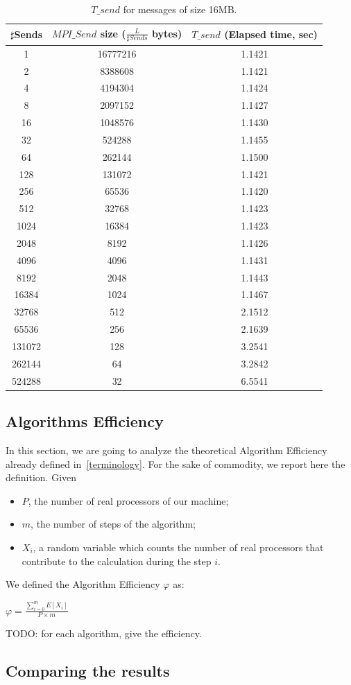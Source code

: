 \begin{table}[h]
\begin{center}
\begin{tabular}{|c|c|c|}\hline
\hline
$\sharp$Sends          & $MPI\_Send$ size ($\frac{L}{\sharp Sends}$ bytes)          & $T\_send$ (Elapsed time, sec)      \\\hline\hline
1 & 16777216 & 1.1421 \\\hline
2 & 8388608 & 1.1421 \\\hline
4 & 4194304 & 1.1424 \\\hline
8 & 2097152 & 1.1427 \\\hline
16 & 1048576 & 1.1430 \\\hline
32 & 524288 & 1.1455 \\\hline
64 & 262144 & 1.1500 \\\hline
128 & 131072 & 1.1421 \\\hline
256 & 65536 & 1.1420 \\\hline
512 & 32768 & 1.1423 \\\hline
1024 & 16384 & 1.1423 \\\hline
2048 & 8192 & 1.1426 \\\hline
4096 & 4096 & 1.1431 \\\hline
8192 & 2048 & 1.1443 \\\hline
16384 & 1024 & 1.1467 \\\hline
32768 & 512 & 2.1512 \\\hline
65536 & 256 & 2.1639 \\\hline
131072 & 128 & 3.2541 \\\hline
262144 & 64 & 3.2842 \\\hline
524288 & 32 & 6.5541 \\\hline
\hline
\end{tabular}
\caption{$T\_send$ for messages of size 16MB. }
\label{tsetup-impact-16}
\end{center}
\end{table}



\subsection{Algorithms Efficiency}
In this section, we are going to analyze the theoretical Algorithm Efficiency already defined in~\ref{terminology}. For the sake of commodity, we report here the definition. Given
\begin{itemize}
\item $P$, the number of real processors of our machine; 
\item $m$, the number of steps of the algorithm;
\item $X_i$, a random variable which counts the number of real processors that contribute to the calculation during the step $i$.
\end{itemize}
We defined the Algorithm Efficiency $\varphi$ as:
\begin{center}
$\varphi = \frac{\sum_{i=0}^m E[X_i]}{P \times m} $
\end{center}
TODO: for each algorithm, give the efficiency.

\subsection{Comparing the results}